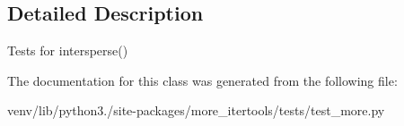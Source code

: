 \subsection{Detailed Description}
\begin{DoxyVerb}Tests for intersperse() \end{DoxyVerb}
 

The documentation for this class was generated from the following file\+:\begin{DoxyCompactItemize}
\item 
venv/lib/python3./site-\/packages/more\+\_\+itertools/tests/test\+\_\+more.\+py\end{DoxyCompactItemize}
